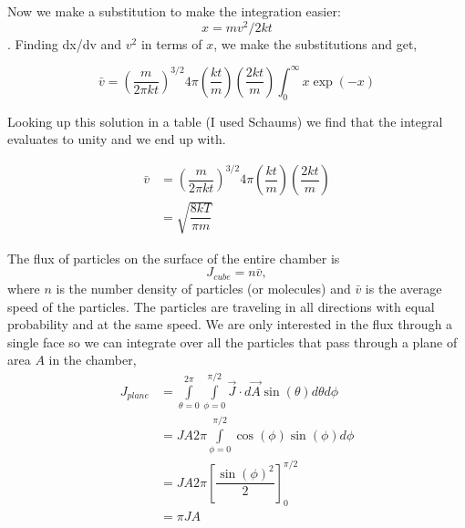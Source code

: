 \documentclass[12pt]{article}
\renewcommand{\=}[1]{\stackrel{#1}{=}} %
\theoremstyle{definition}
\theoremstyle{remark}
\begin{document}
Now we make a substitution to make the integration easier: $$x = mv^2/2kt$$. Finding dx/dv and $v^2$ in terms of $x$,  we make the substitutions and get,

\[
	\bar{v} = \left(\dfrac{m}{2\pi kt}\right)^{3/2} 4\pi\left(\dfrac{kt}{m}\right) \left(\dfrac{2kt}{m}\right) \int_{0}^{\infty} x \exp{\left(-x\right)}
\]

Looking up this solution in a table (I used Schaums) we find that the integral evaluates to unity and we end up with.

\begin{align*}
	\bar{v} &=  \left(\dfrac{m}{2\pi kt}\right)^{3/2} 4\pi\left(\dfrac{kt}{m}\right) \left(\dfrac{2kt}{m}\right)\\[3mm]
		&= \sqrt{\dfrac{8kT}{\pi m}}
\end{align*}
	
The flux of particles on the surface of the entire chamber is
\[
 J_{cube} = n\bar{v},
\]
where $n$ is the number density of particles (or molecules) and $\bar{v}$ is the average speed of the particles. The particles are traveling in all directions with equal probability and at the same speed. We are only interested in the flux through a single face so we  can integrate over all the particles that pass through a plane of area $A$ in the chamber,
\begin{align*}
	J_{plane} &= \int\limits_{\theta = 0}^{2\pi} \int\limits_{\phi = 0}^{\pi/2} \vec{J}\cdot d\vec{A} \sin(\theta) d\theta d\phi\\[3mm]
		&= JA2\pi \int\limits_{\phi = 0}^{\pi/2}\cos(\phi)\sin(\phi)d\phi\\[3mm]
		&= JA2\pi \left[\dfrac{\sin(\phi)^2}{2}\right]_{0}^{\pi/2}\\[3mm]
		&= \pi J A
\end{align*}
\end{document}
